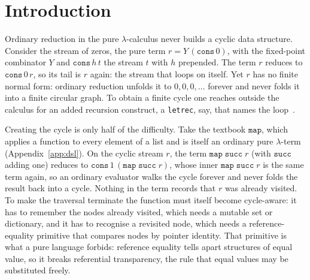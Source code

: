 
\maketitle

\section{Introduction}\label{sec:intro}

Ordinary reduction in the pure $\lambda$-calculus never builds a cyclic data structure. Consider
the stream of zeros, the pure term $r = Y\,(\mathtt{cons}\,0)$, with the fixed-point combinator
$Y$ and $\mathtt{cons}\,h\,t$ the stream $t$ with $h$ prepended. The term $r$
reduces to $\mathtt{cons}\,0\,r$, so its tail is $r$ again: the stream that loops on itself. Yet
$r$ has no finite normal form: ordinary reduction unfolds it to $0,0,0,\dots$ forever and never
folds it into a finite circular graph. To obtain a finite cycle one reaches outside the calculus
for an added recursion construct, a \texttt{letrec}, say, that names the
loop~\cite{ariola1997-explicit-recursion}.

Creating the cycle is only half of the difficulty. Take the textbook $\mathtt{map}$, which
applies a function to every element of a list and is itself an ordinary pure $\lambda$-term
(Appendix~\ref{app:dsl}). On the cyclic stream $r$, the term $\mathtt{map}\;\mathtt{succ}\;r$
(with $\mathtt{succ}$ adding one) reduces to $\mathtt{cons}\,1\,(\mathtt{map}\;\mathtt{succ}\;r)$,
whose inner $\mathtt{map}\;\mathtt{succ}\;r$ is the same term again, so an ordinary evaluator
walks the cycle forever and never folds the result back into a cycle. Nothing in the term records
that $r$ was already visited. To make the
traversal terminate the function
must itself become cycle-aware: it has to remember the nodes already visited, which needs a
mutable set or
dictionary, and it has to recognise a revisited node, which needs a reference-equality primitive
that compares nodes by pointer identity. That primitive is what a pure language forbids:
reference equality tells apart structures of equal value, so it breaks referential transparency,
the rule that equal values may be substituted freely.

